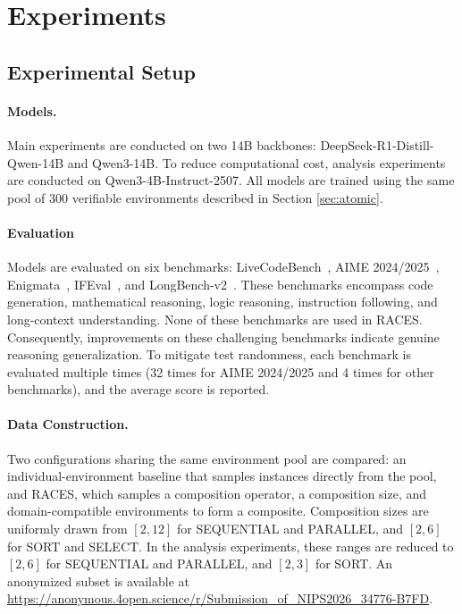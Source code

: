 \section{Experiments}
\label{sec:experiments}
\subsection{Experimental Setup}
\label{sec:exp_setup}
\paragraph{Models.}
Main experiments are conducted on two 14B backbones: DeepSeek-R1-Distill-Qwen-14B and Qwen3-14B.
To reduce computational cost, analysis experiments are conducted on Qwen3-4B-Instruct-2507. 
All models are trained using the same pool of 300 verifiable environments described in Section \ref{sec:atomic}.

\paragraph{Evaluation}
Models are evaluated on six benchmarks: LiveCodeBench~\citep{jain2025livecodebench}, AIME 2024/2025~\citep{AIME2024I,AIME2025I}, Enigmata~\citep{chen2026enigmata}, IFEval~\citep{zhou2023instruction}, and LongBench-v2~\citep{bai-etal-2025-longbench}.
These benchmarks encompass code generation, mathematical reasoning, logic reasoning, instruction following, and long-context understanding.
None of these benchmarks are used in RACES. Consequently, improvements on these challenging benchmarks indicate genuine reasoning generalization.
To mitigate test randomness, each benchmark is evaluated multiple times (32 times for AIME 2024/2025 and 4 times for other benchmarks), and the average score is reported.

\paragraph{Data Construction.}
Two configurations sharing the same environment pool are compared: an individual-environment baseline that samples instances directly from the pool, and RACES, which samples a composition operator, a composition size, and domain-compatible environments to form a composite. Composition sizes are uniformly drawn from $[2,12]$ for \textsc{SEQUENTIAL} and \textsc{PARALLEL}, and $[2,6]$ for \textsc{SORT} and \textsc{SELECT}. In the analysis experiments, these ranges are reduced to $[2,6]$ for \textsc{SEQUENTIAL} and \textsc{PARALLEL}, and $[2,3]$ for \textsc{SORT}. An anonymized subset is available at \url{https://anonymous.4open.science/r/Submission_of_NIPS2026_34776-B7FD}.

